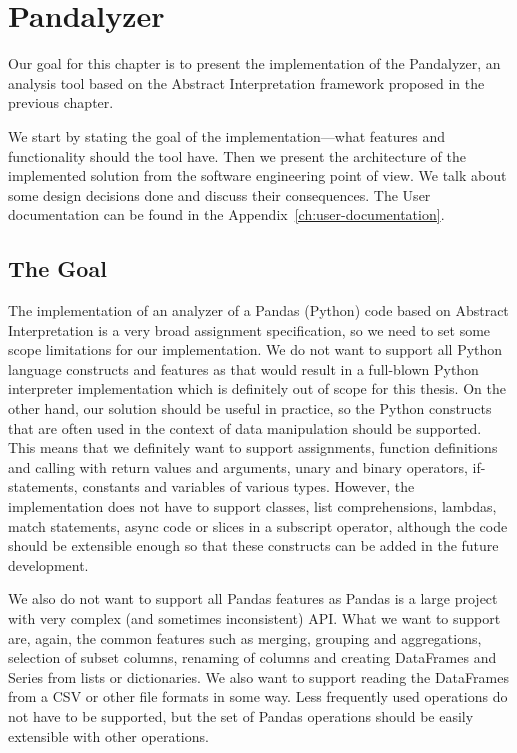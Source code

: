 \chapter{Pandalyzer}

Our goal for this chapter is to present the implementation of the Pandalyzer, an analysis tool based on the Abstract
Interpretation framework proposed in the previous chapter.

We start by stating the goal of the implementation---what features and functionality should the tool have.
Then we present the architecture of the implemented solution from the software engineering point of view.
We talk about some design decisions done and discuss their consequences.
The User documentation can be found in the Appendix~\ref{ch:user-documentation}.


\section{The Goal}

The implementation of an analyzer of a Pandas (Python) code based on Abstract Interpretation is a very
broad assignment specification, so we need to set some scope limitations for our implementation.
We do not want to support all Python language constructs and features as that would result in a full-blown Python
interpreter implementation which is definitely out of scope for this thesis.
On the other hand, our solution should be useful in practice, so the Python constructs that are often used in the
context of data manipulation should be supported.
This means that we definitely want to support assignments, function definitions and calling with return values and
arguments, unary and binary operators, if-statements, constants and variables of various types.
However, the implementation does not have to support classes, list comprehensions, lambdas, match statements, async code
or slices in a subscript operator, although the code should be extensible enough so that these constructs can be added
in the future development.


We also do not want to support all Pandas features as Pandas is a large project with very complex
(and sometimes inconsistent) API\@.
What we want to support are, again, the common features such as merging, grouping and aggregations, selection of
subset columns, renaming of columns and creating DataFrames and Series from lists or dictionaries.
We also want to support reading the DataFrames from a CSV or other file formats in some way.
Less frequently used operations do not have to be supported, but the set of Pandas operations should be easily
extensible with other operations.

